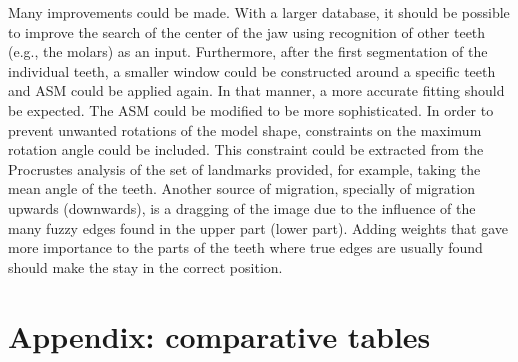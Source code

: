 \documentclass[a4paper,11pt,twoside]{article}
\begin{document}
Many improvements could be made. With a larger database, it should be possible to improve the search of the center of the jaw using recognition of other teeth (e.g., the molars) as an input. Furthermore, after the first segmentation of the individual teeth, a smaller window could be constructed around a specific teeth and ASM could be applied again. In that manner, a more accurate fitting should be expected. The ASM could be modified to be more sophisticated. In order to prevent unwanted rotations of the model shape, constraints on the maximum rotation angle could be included. This constraint could be extracted from the Procrustes analysis of the set of landmarks provided, for example, taking the mean angle of the teeth. Another source of migration, specially of migration upwards (downwards), is a dragging of the image due to the influence of the many fuzzy edges found in the upper part (lower part). Adding weights that gave more importance to the parts of the teeth where true edges are usually found should make the stay in the correct position.


\newpage{}


\appendix

\section{Appendix: comparative tables}\label{appendixA}
\end{document}
